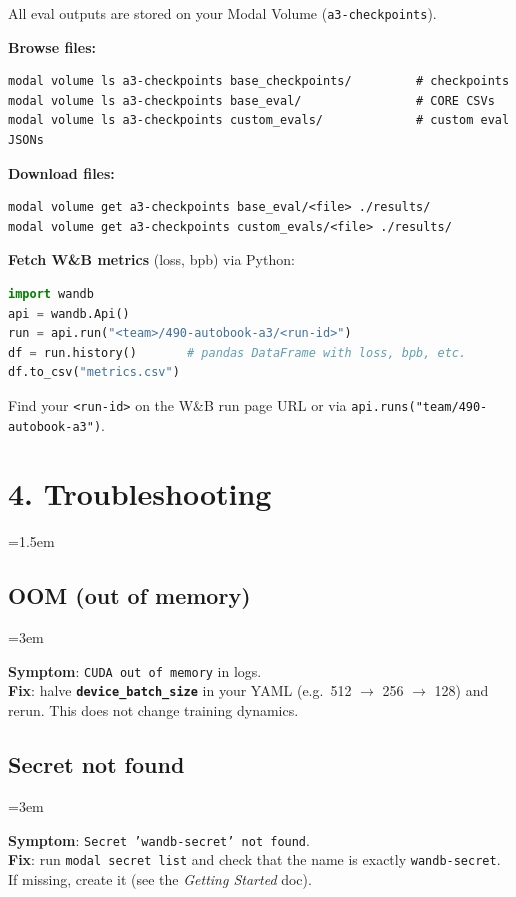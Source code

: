\documentclass[9pt]{extarticle}
\newcommand{\cmd}[1]{\colorbox{gray!10}{\texttt{#1}}}
\newcommand{\field}[1]{\texttt{\textbf{#1}}}
\begin{document}
All eval outputs are stored on your Modal Volume (\cmd{a3-checkpoints}).

\textbf{Browse files:}

\begin{lstlisting}
modal volume ls a3-checkpoints base_checkpoints/         # checkpoints
modal volume ls a3-checkpoints base_eval/                # CORE CSVs
modal volume ls a3-checkpoints custom_evals/             # custom eval JSONs
\end{lstlisting}

\textbf{Download files:}

\begin{lstlisting}
modal volume get a3-checkpoints base_eval/<file> ./results/
modal volume get a3-checkpoints custom_evals/<file> ./results/
\end{lstlisting}

\textbf{Fetch W\&B metrics} (loss, bpb) via Python:

\begin{lstlisting}[language=Python]
import wandb
api = wandb.Api()
run = api.run("<team>/490-autobook-a3/<run-id>")
df = run.history()       # pandas DataFrame with loss, bpb, etc.
df.to_csv("metrics.csv")
\end{lstlisting}

Find your \cmd{<run-id>} on the W\&B run page URL or via \cmd{api.runs("team/490-autobook-a3")}.

\leftskip=0pt
\section*{4. Troubleshooting}
\leftskip=1.5em

\subsection*{OOM (out of memory)}
\leftskip=3em

\textbf{Symptom}: \cmd{CUDA out of memory} in logs.\\
\textbf{Fix}: halve \field{device\_batch\_size} in your YAML (e.g.\ 512 $\to$ 256 $\to$ 128) and rerun. This does not change training dynamics.

\subsection*{Secret not found}
\leftskip=3em

\textbf{Symptom}: \cmd{Secret 'wandb-secret' not found}.\\
\textbf{Fix}: run \cmd{modal secret list} and check that the name is exactly \cmd{wandb-secret}. If missing, create it (see the \textit{Getting Started} doc).
\end{document}
